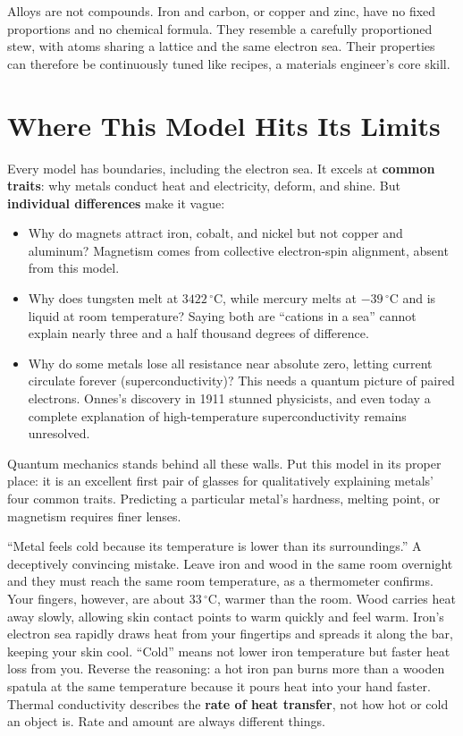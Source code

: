 Alloys are not compounds. Iron and carbon, or copper and zinc, have no fixed proportions and no chemical formula. They resemble a carefully proportioned stew, with atoms sharing a lattice and the same electron sea. Their properties can therefore be continuously tuned like recipes, a materials engineer's core skill.

\section{Where This Model Hits Its Limits}

Every model has boundaries, including the electron sea. It excels at \textbf{common traits}: why metals conduct heat and electricity, deform, and shine. But \textbf{individual differences} make it vague:

\begin{itemize}[itemsep=2pt]
\item Why do magnets attract iron, cobalt, and nickel but not copper and aluminum? Magnetism comes from collective electron-spin alignment, absent from this model.
\item Why does tungsten melt at $3422\,^{\circ}\mathrm{C}$, while mercury melts at $-39\,^{\circ}\mathrm{C}$ and is liquid at room temperature? Saying both are ``cations in a sea'' cannot explain nearly three and a half thousand degrees of difference.
\item Why do some metals lose all resistance near absolute zero, letting current circulate forever (superconductivity)? This needs a quantum picture of paired electrons. Onnes's discovery in 1911 stunned physicists, and even today a complete explanation of high-temperature superconductivity remains unresolved.
\end{itemize}

Quantum mechanics stands behind all these walls. Put this model in its proper place: it is an excellent first pair of glasses for qualitatively explaining metals' four common traits. Predicting a particular metal's hardness, melting point, or magnetism requires finer lenses.

\begin{wuqu}
``Metal feels cold because its temperature is lower than its surroundings.'' A deceptively convincing mistake. Leave iron and wood in the same room overnight and they must reach the same room temperature, as a thermometer confirms. Your fingers, however, are about $33\,^{\circ}\mathrm{C}$, warmer than the room. Wood carries heat away slowly, allowing skin contact points to warm quickly and feel warm. Iron's electron sea rapidly draws heat from your fingertips and spreads it along the bar, keeping your skin cool. ``Cold'' means not lower iron temperature but faster heat loss from you. Reverse the reasoning: a hot iron pan burns more than a wooden spatula at the same temperature because it pours heat into your hand faster. Thermal conductivity describes the \textbf{rate of heat transfer}, not how hot or cold an object is. Rate and amount are always different things.
\end{wuqu}

